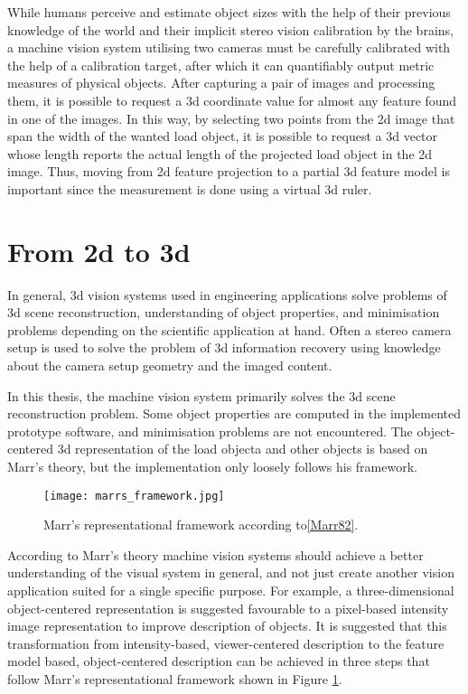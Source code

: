 \documentclass[12pt,a4paper,oneside,pdftex]{report}
\begin{document}
{While humans perceive and estimate object sizes with the help of their previous knowledge of the world and their implicit stereo vision calibration by the brains, a machine vision system utilising two cameras must be carefully calibrated with the help of a calibration target, after which it can quantifiably output metric measures of physical objects. After capturing a pair of images and processing them, it is possible to request a 3d coordinate value for almost any feature found in one of the images. In this way, by selecting two points from the 2d image that span the width of the wanted load object, it is possible to request a 3d vector whose length reports the actual length of the projected load object in the 2d image. Thus, moving from 2d feature projection to a partial 3d feature model is important since the measurement is done using a virtual 3d ruler.

\section{From 2d to 3d}
\label{section:from_2d_to_3d}

In general, 3d vision systems used in engineering applications solve problems of 3d scene reconstruction, understanding of object properties, and minimisation problems depending on the scientific application at hand. Often a stereo camera setup is used to solve the problem of 3d information recovery using knowledge about the camera setup geometry and the imaged content\cite{Sonka07}. 

In this thesis, the machine vision system primarily solves the 3d scene reconstruction problem. Some object properties are computed in the implemented prototype software, and minimisation problems are not encountered. The object-centered 3d representation of the load objecta and other objects is based on Marr's theory, but the implementation only loosely follows his framework. 

\begin{figure}[ht]
  \begin{center}
    \texttt{[image: marrs\_framework.jpg]}
    \caption{Marr's representational framework according to\ref{Marr82}.}
    \label{fig:marrs_framework}
  \end{center}
\end{figure}

According to Marr's theory machine vision systems should achieve a better understanding of the visual system in general, and not just create another vision application suited for a single specific purpose. For example, a three-dimensional object-centered representation is suggested favourable to a pixel-based intensity image representation to improve description of objects. It is suggested that this transformation from intensity-based, viewer-centered description to the feature model based, object-centered description can be achieved in three steps that follow Marr's representational framework shown in Figure \ref{fig:marrs_framework}.

}
\end{document}
